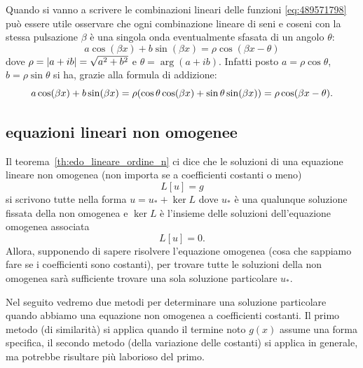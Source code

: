 % 
\begin{remark}
Quando si vanno a scrivere le combinazioni lineari delle funzioni 
\eqref{eq:489571798}
può essere utile osservare
che ogni combinazione lineare di seni e coseni
con la stessa pulsazione $\beta$ è una singola onda
eventualmente sfasata di un angolo $\theta$:
\[
  a \cos (\beta x) + b \sin (\beta x)
  =
  \rho \cos(\beta x - \theta)
\]
dove $\rho = {\left|a+ib\right|} = \sqrt{a^2+b^2}$ e 
$\theta=\arg(a+ib)$. 
Infatti
posto $a=\rho\cos \theta$, $b=\rho \sin \theta$ si ha,
grazie alla formula di addizione:
\[
   a \cos (\beta x) + b \sin (\beta x)
   = \rho{\left( \cos \theta \cos(\beta x) + \sin \theta \sin (\beta x) \right)}
   = \rho \cos(\beta x - \theta).
\]
\end{remark}

\subsection{equazioni lineari non omogenee}

Il teorema~\ref{th:edo_lineare_ordine_n}
ci dice che le soluzioni di una 
 equazione lineare non omogenea (non importa se a coefficienti costanti o meno)
\[
  L[u]=g
\]
si scrivono tutte nella forma $u = u_* + \ker L$ dove 
$u_*$ è una qualunque soluzione fissata della non omogenea 
e $\ker L$ è l'insieme delle soluzioni dell'equazione omogenea 
associata 
\[
  L[u] =0. 
\]
Allora, supponendo di sapere risolvere l'equazione omogenea 
(cosa che sappiamo fare se i coefficienti sono costanti),
per trovare tutte le soluzioni della non omogenea sarà sufficiente 
trovare una sola soluzione particolare $u_*$.

Nel seguito vedremo due metodi per determinare una soluzione particolare 
quando abbiamo una equazione non omogenea a coefficienti costanti. 
Il primo metodo (di similarità) si applica quando il termine noto $g(x)$ assume una forma specifica,
il secondo metodo (della variazione delle costanti) si applica in generale, ma potrebbe risultare 
più laborioso del primo.

